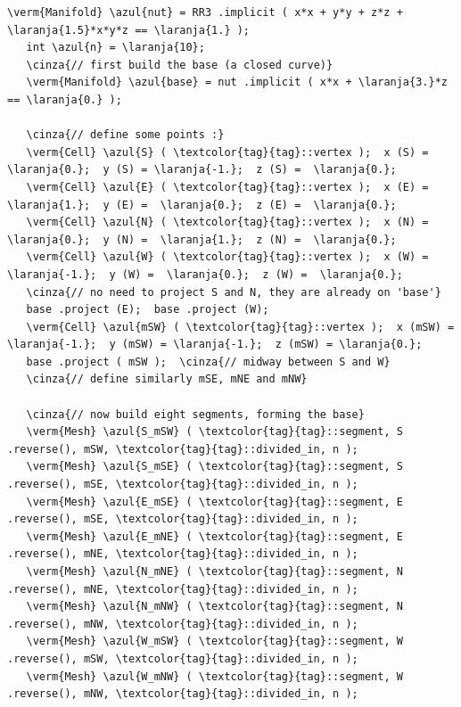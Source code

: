 \begin{Verbatim}[commandchars=\\\{\},formatcom=\small\tt,frame=single,
   label=parag-\ref{\numb section 2.\numb parag 16}.cpp,rulecolor=\color{coment},
   baselinestretch=0.94,framesep=2mm]
   \verm{Manifold} \azul{nut} = RR3 .implicit ( x*x + y*y + z*z + \laranja{1.5}*x*y*z == \laranja{1.} );
   int \azul{n} = \laranja{10};
   \cinza{// first build the base (a closed curve)}
   \verm{Manifold} \azul{base} = nut .implicit ( x*x + \laranja{3.}*z == \laranja{0.} );

   \cinza{// define some points :}
   \verm{Cell} \azul{S} ( \textcolor{tag}{tag}::vertex );  x (S) =  \laranja{0.};  y (S) = \laranja{-1.};  z (S) =  \laranja{0.};
   \verm{Cell} \azul{E} ( \textcolor{tag}{tag}::vertex );  x (E) =  \laranja{1.};  y (E) =  \laranja{0.};  z (E) =  \laranja{0.};
   \verm{Cell} \azul{N} ( \textcolor{tag}{tag}::vertex );  x (N) =  \laranja{0.};  y (N) =  \laranja{1.};  z (N) =  \laranja{0.};
   \verm{Cell} \azul{W} ( \textcolor{tag}{tag}::vertex );  x (W) = \laranja{-1.};  y (W) =  \laranja{0.};  z (W) =  \laranja{0.};
   \cinza{// no need to project S and N, they are already on 'base'}
   base .project (E);  base .project (W);
   \verm{Cell} \azul{mSW} ( \textcolor{tag}{tag}::vertex );  x (mSW) = \laranja{-1.};  y (mSW) = \laranja{-1.};  z (mSW) = \laranja{0.};
   base .project ( mSW );  \cinza{// midway between S and W}
   \cinza{// define similarly mSE, mNE and mNW}

   \cinza{// now build eight segments, forming the base}
   \verm{Mesh} \azul{S_mSW} ( \textcolor{tag}{tag}::segment, S .reverse(), mSW, \textcolor{tag}{tag}::divided_in, n );
   \verm{Mesh} \azul{S_mSE} ( \textcolor{tag}{tag}::segment, S .reverse(), mSE, \textcolor{tag}{tag}::divided_in, n );
   \verm{Mesh} \azul{E_mSE} ( \textcolor{tag}{tag}::segment, E .reverse(), mSE, \textcolor{tag}{tag}::divided_in, n );
   \verm{Mesh} \azul{E_mNE} ( \textcolor{tag}{tag}::segment, E .reverse(), mNE, \textcolor{tag}{tag}::divided_in, n );
   \verm{Mesh} \azul{N_mNE} ( \textcolor{tag}{tag}::segment, N .reverse(), mNE, \textcolor{tag}{tag}::divided_in, n );
   \verm{Mesh} \azul{N_mNW} ( \textcolor{tag}{tag}::segment, N .reverse(), mNW, \textcolor{tag}{tag}::divided_in, n );
   \verm{Mesh} \azul{W_mSW} ( \textcolor{tag}{tag}::segment, W .reverse(), mSW, \textcolor{tag}{tag}::divided_in, n );
   \verm{Mesh} \azul{W_mNW} ( \textcolor{tag}{tag}::segment, W .reverse(), mNW, \textcolor{tag}{tag}::divided_in, n );


\end{Verbatim}
